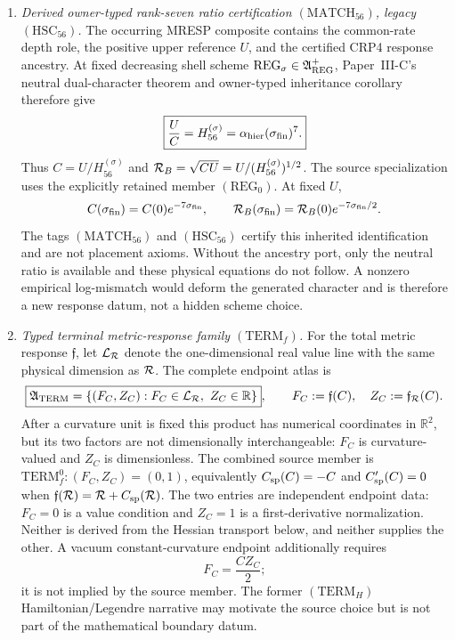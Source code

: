 \documentclass[12pt,a4paper]{article}
\begin{document}
\begin{definition}
\begin{enumerate}[label=(\roman*)]
\item \emph{Derived owner-typed rank-seven ratio certification
\((\mathrm{MATCH}_{56})\), legacy \((\mathrm{HSC}_{56})\).}
The occurring MRESP composite contains the common-rate depth role, the
positive upper reference \(U\), and the certified CRP4 response ancestry.  At fixed
decreasing shell scheme
\(\mathrm{REG}_\sigma\in\mathfrak A_{\rm REG}^{+}\), Paper~III-C's neutral
dual-character theorem and owner-typed inheritance corollary therefore give
\[
 \boxed{\frac{U}{C}
 =H_{56}^{(\sigma)}
 =\alpha_{\rm hier}(\sigma_{\rm fin})^7.}
\]
Thus \(C=U/H_{56}^{(\sigma)}\) and
\(\mathcal R_B=\sqrt{CU}=U/(H_{56}^{(\sigma)})^{1/2}\).
The source specialization uses the explicitly retained member \((\mathrm{REG}_0)\).
At fixed \(U\),
\[
 C(\sigma_{\rm fin})=C(0)e^{-7\sigma_{\rm fin}},\qquad
 \mathcal R_B(\sigma_{\rm fin})=\mathcal R_B(0)e^{-7\sigma_{\rm fin}/2}.
\]
The tags \((\mathrm{MATCH}_{56})\) and
\((\mathrm{HSC}_{56})\) certify this inherited identification and are not
placement axioms.  Without the ancestry port, only the neutral ratio is
available and these physical equations do not follow.  A nonzero empirical log-mismatch would deform the
generated character and is therefore a new response datum, not a hidden
scheme choice.

\item \emph{Typed terminal metric-response family \((\mathrm{TERM}_f)\).}
For the total metric response \(\mathfrak f\), let
\(\mathcal L_{\mathcal R}\) denote the one-dimensional real value line with the
same physical dimension as \(\mathcal R\).  The complete endpoint atlas is
\[
 \boxed{\mathfrak A_{\rm TERM}
 =\{(F_C,Z_C):F_C\in\mathcal L_{\mathcal R},\ Z_C\in\mathbb R\}},
 \qquad
 F_C:=\mathfrak f(C),\quad Z_C:=\mathfrak f_{\mathcal R}(C).
\]
After a curvature unit is fixed this product has numerical coordinates
in \(\mathbb R^2\), but its two factors are not dimensionally interchangeable:
\(F_C\) is curvature-valued and \(Z_C\) is dimensionless.
The combined source member is
\(\mathrm{TERM}_f^0:(F_C,Z_C)=(0,1)\), equivalently
\(C_{\rm sp}(C)=-C\) and \(C_{\rm sp}'(C)=0\) when
\(\mathfrak f(\mathcal R)=\mathcal R+C_{\rm sp}(\mathcal R)\).
The two entries are independent endpoint data: \(F_C=0\) is a value
condition and \(Z_C=1\) is a first-derivative normalization.  Neither is
derived from the Hessian transport below, and neither supplies the other.
A vacuum constant-curvature endpoint additionally requires
\[
 \boxed{F_C=\frac{C Z_C}{2};}
\]
it is not implied by the source member.  The former
\((\mathrm{TERM}_H)\) Hamiltonian/Legendre narrative may motivate the source
choice but is not part of the mathematical boundary datum.


\end{enumerate}
\end{definition}
\end{document}
